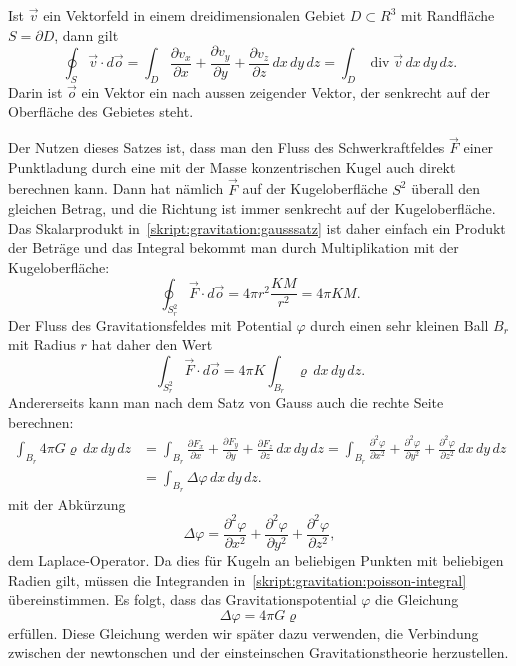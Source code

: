\begin{satz}[Gauss] Ist $\vec v$ ein Vektorfeld in
einem dreidimensionalen Gebiet $D\subset R^3$ mit Randfläche $S=\partial D$,
dann gilt
\begin{equation}
\oint_S \vec v\cdot d\vec o
=
\int_D 
\frac{\partial v_x}{\partial x}
+
\frac{\partial v_y}{\partial y}
+
\frac{\partial v_z}{\partial z}
\,dx\,dy\,dz
=
\int_D \operatorname{div}\vec v\,dx\,dy\,dz.
\label{skript:gravitation:gausssatz}
\end{equation}
Darin ist $\vec o$ ein Vektor ein nach aussen zeigender Vektor, der
senkrecht auf der Oberfläche des Gebietes steht.
\end{satz}

Der Nutzen dieses Satzes ist, dass man den Fluss des Schwerkraftfeldes
$\vec F$ einer Punktladung durch eine mit der Masse konzentrischen
Kugel auch direkt berechnen kann.
Dann hat nämlich $\vec F$ auf der Kugeloberfläche $S^2$ überall den gleichen
Betrag, und die Richtung ist immer senkrecht auf der Kugeloberfläche.
Das Skalarprodukt in~\eqref{skript:gravitation:gausssatz} ist daher
einfach ein Produkt der Beträge und das Integral bekommt man durch
Multiplikation mit der Kugeloberfläche:
\[
\oint_{S^2_r} \vec F\cdot d\vec o
=
4\pi r^2
\frac{KM}{r^2}
=
4\pi KM.
\]
Der Fluss des Gravitationsfeldes mit Potential $\varphi$ durch einen
sehr kleinen Ball $B_r$ mit Radius $r$ hat daher den Wert
\[
\int_{S^2_r}\vec F\cdot d\vec o
=
4\pi K\int_{B_r} \varrho\,dx\,dy\,dz.
\]
Andererseits kann man nach dem Satz von Gauss auch die rechte 
Seite berechnen:
\begin{align*}
\int_{B_r} 4\pi G\varrho\,dx\,dy\,dz
&=
\int_{B_r}
\frac{\partial F_x}{\partial x}+
\frac{\partial F_y}{\partial y}+
\frac{\partial F_z}{\partial z}
\,dx\,dy\,dz
=
\int_{B_r}
\frac{\partial^2\varphi}{\partial x^2}+
\frac{\partial^2\varphi}{\partial y^2}+
\frac{\partial^2\varphi}{\partial z^2}
\,dx\,dy\,dz
\\
&=
\int_{B_r} \Delta\varphi\,dx\,dy\,dz.
\label{skript:gravitation:poisson-integral}
\end{align*}
mit der Abkürzung
\begin{equation*}
\Delta \varphi
=
\frac{\partial^2\varphi}{\partial x^2}+
\frac{\partial^2\varphi}{\partial y^2}+
\frac{\partial^2\varphi}{\partial z^2},
\end{equation*}
dem Laplace-Operator.
Da dies für Kugeln an beliebigen Punkten mit beliebigen Radien 
gilt, müssen die Integranden in~\eqref{skript:gravitation:poisson-integral}
übereinstimmen.
Es folgt, dass das Gravitationspotential $\varphi$ die Gleichung
\begin{equation}
\Delta \varphi = 4\pi G\varrho
\label{skript:gravitation:potentialgleichung}
\end{equation}
erfüllen.
Diese Gleichung werden wir später dazu verwenden, die Verbindung zwischen
der newtonschen und der einsteinschen Gravitationstheorie herzustellen.

